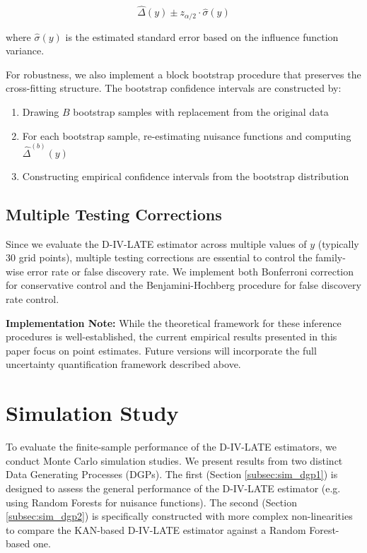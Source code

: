 \documentclass[final,3p,fleqn, 10pt]{elsarticle}
\begin{document}
$$\hat{\Delta}(y) \pm z_{\alpha/2} \cdot \hat{\sigma}(y)$$

where $\hat{\sigma}(y)$ is the estimated standard error based on the influence function variance.

For robustness, we also implement a block bootstrap procedure that preserves the cross-fitting structure. The bootstrap confidence intervals are constructed by:
\begin{enumerate}
\item Drawing $B$ bootstrap samples with replacement from the original data
\item For each bootstrap sample, re-estimating nuisance functions and computing $\hat{\Delta}^{(b)}(y)$
\item Constructing empirical confidence intervals from the bootstrap distribution
\end{enumerate}

\subsection{Multiple Testing Corrections}

Since we evaluate the D-IV-LATE estimator across multiple values of $y$ (typically 30 grid points), multiple testing corrections are essential to control the family-wise error rate or false discovery rate. We implement both Bonferroni correction for conservative control and the Benjamini-Hochberg procedure for false discovery rate control.

\textbf{Implementation Note:} While the theoretical framework for these inference procedures is well-established, the current empirical results presented in this paper focus on point estimates. Future versions will incorporate the full uncertainty quantification framework described above.

\section{Simulation Study}
\label{sec:simulations}

To evaluate the finite-sample performance of the D-IV-LATE estimators, we conduct Monte Carlo simulation studies. We present results from two distinct Data Generating Processes (DGPs). The first (Section \ref{subsec:sim_dgp1}) is designed to assess the general performance of the D-IV-LATE estimator (e.g. using Random Forests for nuisance functions). The second (Section \ref{subsec:sim_dgp2}) is specifically constructed with more complex non-linearities to compare the KAN-based D-IV-LATE estimator against a Random Forest-based one.
\end{document}
